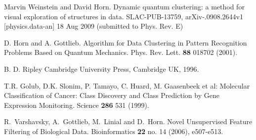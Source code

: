\documentclass[fleqn,twoside]{article}
\begin{document}
\begin{thebibliography}{9}


Marvin Weinstein and David Horn.
Dynamic quantum clustering: a method for visual exploration of structures in data.
SLAC-PUB-13759, arXiv-.0908.2644v1 [physics.data-an] 18 Aug 2009 (submitted to Phys.
Rev. E)

D. Horn and A. Gottlieb.
Algorithm for Data Clustering in Pattern Recognition Problems Based on
Quantum Mechanics.
Phys. Rev. Lett. {\bf 88} 018702 (2001).

B. D. Ripley
\newblock Cambridge University Press, Cambridge UK, 1996.

T.R. Golub, D.K. Slonim, P. Tamayo, C. Huard, M. Gaasenbeek et al: Molecular Classification of Cancer:
Class Discovery and Class Prediction by Gene Expression Monitoring. {\em} Science
{\bf 286} 531 (1999).

R.~Varshavsky, A.~Gottlieb, M.~Linial and D.~Horn.
Novel Unsupervised Feature Filtering of Biological Data.
Bioinformatics {\bf 22} no. 14 (2006), e507-e513.


\end{thebibliography}
\end{document}
